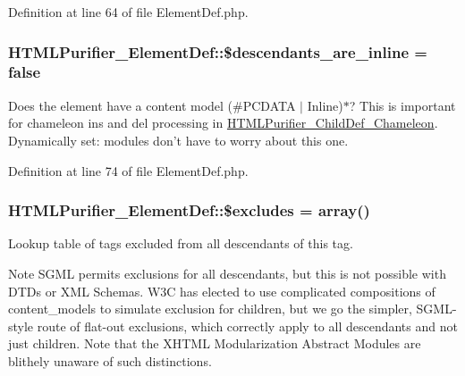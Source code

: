 Definition at line 64 of file Element\+Def.\+php.

\hypertarget{classHTMLPurifier__ElementDef_abb620edb77a4817b18aeed07343d002b}{
\subsubsection[{\$descendants\+\_\+are\+\_\+inline}]{\setlength{\rightskip}{0pt plus 5cm}H\+T\+M\+L\+Purifier\+\_\+\+Element\+Def\+::\$descendants\+\_\+are\+\_\+inline = false}}\label{classHTMLPurifier__ElementDef_abb620edb77a4817b18aeed07343d002b}
Does the element have a content model (\#\+P\+C\+D\+A\+T\+A $\vert$ Inline)$\ast$? This is important for chameleon ins and del processing in \hyperlink{classHTMLPurifier__ChildDef__Chameleon}{H\+T\+M\+L\+Purifier\+\_\+\+Child\+Def\+\_\+\+Chameleon}. Dynamically set\+: modules don't have to worry about this one. 

Definition at line 74 of file Element\+Def.\+php.

\hypertarget{classHTMLPurifier__ElementDef_a878b52c232dac0e65eec37048c47299f}{
\subsubsection[{\$excludes}]{\setlength{\rightskip}{0pt plus 5cm}H\+T\+M\+L\+Purifier\+\_\+\+Element\+Def\+::\$excludes = array()}}\label{classHTMLPurifier__ElementDef_a878b52c232dac0e65eec37048c47299f}
Lookup table of tags excluded from all descendants of this tag. \begin{DoxyNote}{Note}
S\+G\+M\+L permits exclusions for all descendants, but this is not possible with D\+T\+Ds or X\+M\+L Schemas. W3\+C has elected to use complicated compositions of content\+\_\+models to simulate exclusion for children, but we go the simpler, S\+G\+M\+L-\/style route of flat-\/out exclusions, which correctly apply to all descendants and not just children. Note that the X\+H\+T\+M\+L Modularization Abstract Modules are blithely unaware of such distinctions. 
\end{DoxyNote}


